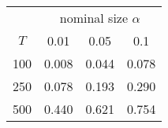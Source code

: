 % 
\begin{tabular}{cccc}
  \hline
  & \multicolumn{3}{c}{nominal size $\alpha$} \\
 $T$ & 0.01 & 0.05 & 0.1 \\
 \hline
100 & 0.008 & 0.044 & 0.078 \\ 
  250 & 0.078 & 0.193 & 0.290 \\ 
  500 & 0.440 & 0.621 & 0.754 \\ 
   \hline
\end{tabular}
